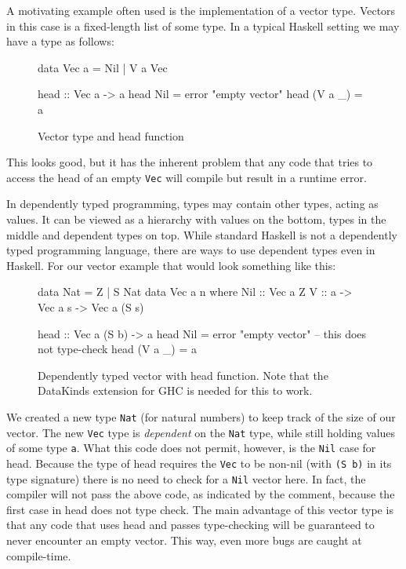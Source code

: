 \documentclass[a4paper,12pt,twosided]{report}
\begin{document}
A motivating example often used is the implementation of a vector type. Vectors
in this case is a fixed-length list of some type. In a typical Haskell setting
we may have a type as follows:

\begin{figure}[H]
\begin{code}
data Vec a = Nil | V a Vec

head :: Vec a -> a
head Nil = error "empty vector"
head (V a _) = a
\end{code}
\caption{Vector type and head function}
\end{figure}

This looks good, but it has the inherent problem that any code that tries to
access the head of an empty \texttt{Vec} will compile but result in a runtime error. 

In dependently typed programming, types may contain other types, acting as
values. It can be viewed as a hierarchy with values on the bottom, types in the
middle and dependent types on top. While standard Haskell is not a dependently
typed programming language, there are ways to use dependent types even in
Haskell. For our vector example that would look something like this:

\begin{figure}[H]
\begin{code}
data Nat = Z | S Nat
data Vec a n where
    Nil :: Vec a Z
    V :: a -> Vec a s -> Vec a (S s)

head :: Vec a (S b) -> a
head Nil = error "empty vector" -- this does not type-check
head (V a _) = a
\end{code}
\caption{Dependently typed vector with head function. Note that the DataKinds
extension for GHC is needed for this to work.}
\end{figure}

We created a new type \texttt{Nat} (for natural numbers) to keep track of the
size of our vector. The new \texttt{Vec} type is \textit{dependent} on the
\texttt{Nat} type, while still holding values of some type \texttt{a}. What this
code does not permit, however, is the \texttt{Nil} case for head. Because the
type of head requires the \texttt{Vec} to be non-nil (with \texttt{(S b)} in its
type signature) there is no need to check for a \texttt{Nil} vector here. In
fact, the compiler will not pass the above code, as indicated by the comment,
because the first case in head does not type check. The main advantage of this
vector type is that any code that uses head and passes type-checking will be
guaranteed to never encounter an empty vector.  This way, even more bugs are
caught at compile-time.
\end{document}
